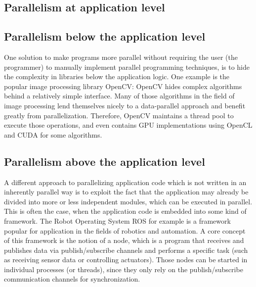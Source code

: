 \documentclass[BCOR20mm,DIV14,10pt,headinclude,footexclude,bibtotoc,liststotoc]{article}
\begin{document}

\subsection{Parallelism at application level}

\subsection{Parallelism below the application level}
One solution to make programs more parallel without requiring the user (the
programmer) to manually implement parallel programming techniques, is to hide
the complexity in libraries below the application logic. One example is the
popular image processing library OpenCV: OpenCV hides complex algorithms behind
a relatively simple interface. Many of those algorithms in the field of image
processing lend themselves nicely to a data-parallel approach and benefit
greatly from parallelization. Therefore, OpenCV maintains a thread pool to
execute those operations, and even contains GPU implementations using OpenCL and
CUDA for some algorithms.

\subsection{Parallelism above the application level}
A different approach to parallelizing application code which is not written in
an inherently parallel way is to exploit the fact that the application may
already be divided into more or less independent modules, which can be executed
in parallel. This is often the case, when the application code is embedded into
some kind of framework. The Robot Operating System ROS for example is a
framework popular for application in the fields of robotics and automation. A
core concept of this framework is the notion of a node, which is a program that
receives and publishes data via publish/subscribe channels and performs a
specific task (such as receiving sensor data or controlling actuators). Those
nodes can be started in individual processes (or threads), since they only rely
on the publish/subscribe communication channels for synchronization.
\end{document}
